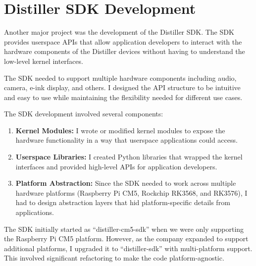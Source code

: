 \documentclass[12pt,a4paper]{report}
\begin{document}

\section{Distiller SDK Development}

Another major project was the development of the Distiller SDK. The SDK provides userspace APIs that allow application developers to interact with the hardware components of the Distiller devices without having to understand the low-level kernel interfaces.

\vspace{0.3cm}

The SDK needed to support multiple hardware components including audio, camera, e-ink display, and others. I designed the API structure to be intuitive and easy to use while maintaining the flexibility needed for different use cases.

\vspace{0.3cm}

The SDK development involved several components:

\begin{enumerate}[itemsep=0.3cm]
    \item \textbf{Kernel Modules:} I wrote or modified kernel modules to expose the hardware functionality in a way that userspace applications could access.

    \item \textbf{Userspace Libraries:} I created Python libraries that wrapped the kernel interfaces and provided high-level APIs for application developers.

    \item \textbf{Platform Abstraction:} Since the SDK needed to work across multiple hardware platforms (Raspberry Pi CM5, Rockchip RK3568, and RK3576), I had to design abstraction layers that hid platform-specific details from applications.
\end{enumerate}

\vspace{0.3cm}

The SDK initially started as ``distiller-cm5-sdk'' when we were only supporting the Raspberry Pi CM5 platform. However, as the company expanded to support additional platforms, I upgraded it to ``distiller-sdk'' with multi-platform support. This involved significant refactoring to make the code platform-agnostic.
\end{document}
